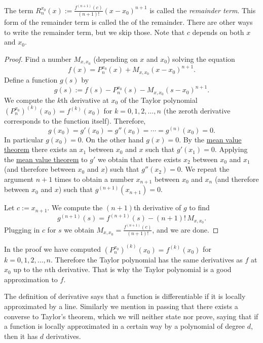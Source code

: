 \documentclass[12pt]{book}
\begin{document}
The term $R_n^{x_0}(x):=\frac{f^{(n+1)}(c)}{(n+1)!}{(x-x_0)}^{n+1}$ is called the
\emph{remainder term}.
This
form 
of the remainder term is called the
\emph{} of the remainder.
There are other ways
to write the remainder term, but we skip those.
Note that $c$ depends on
both $x$ and $x_0$.

\begin{proof}
Find a number $M_{x,x_0}$ (depending on $x$ and $x_0$) solving the equation
\begin{equation*}
f(x)=P_{n}^{x_0}(x)+M_{x,x_0}{(x-x_0)}^{n+1} .
\end{equation*}
Define a function $g(s)$ by
\begin{equation*}
g(s) := f(s)-P_n^{x_0}(s)-M_{x,x_0}{(s-x_0)}^{n+1} .
\end{equation*}
We compute
the $k$th derivative at $x_0$ of the Taylor polynomial
${(P_n^{x_0})}^{(k)}(x_0) = f^{(k)}(x_0)$ for
$k=0,1,2,\ldots,n$ (the zeroth derivative corresponds to the function
itself).
Therefore,
\begin{equation*}
g(x_0) = g'(x_0) = g''(x_0) = \cdots = g^{(n)}(x_0) = 0 .
\end{equation*}
In particular $g(x_0) = 0$.
On the other hand $g(x) = 0$.
By the
\hyperref[thm:mvt]{mean value theorem}
there exists an $x_1$ between $x_0$ and $x$ such that $g'(x_1) = 0$.
Applying the \hyperref[thm:mvt]{mean value theorem}
to $g'$ we obtain that there exists
$x_2$ between $x_0$ and $x_1$ (and therefore between $x_0$ and $x$)
such that $g''(x_2) = 0$.
We repeat the
argument $n+1$ times to obtain a number $x_{n+1}$ between $x_0$ and $x_n$
(and therefore between $x_0$ and $x$) such that $g^{(n+1)}(x_{n+1}) = 0$.

Let $c:=x_{n+1}$.
We compute the $(n+1)$th derivative of $g$ to find
\begin{equation*}
g^{(n+1)}(s) = f^{(n+1)}(s)-(n+1)!\,M_{x,x_0} .
\end{equation*}
Plugging in $c$ for $s$ we obtain $M_{x,x_0} = \frac{f^{(n+1)}(c)}{(n+1)!}$, and
we are done.
\end{proof}

In the proof we have computed 
${(P_n^{x_0})}^{(k)}(x_0) = f^{(k)}(x_0)$ for $k=0,1,2,\ldots,n$.
Therefore the Taylor polynomial has the same derivatives as $f$ at $x_0$
up to the $n$th derivative.
That is why the Taylor polynomial is
a good approximation to $f$.

The definition of derivative says that
a function is
differentiable if it
is locally approximated by a line.
Similarly we mention in passing that there exists a converse to Taylor's
theorem,
which we will neither state nor prove,
saying that if a function is
locally approximated in a certain way by a polynomial of degree $d$, then it
has $d$ derivatives.
\end{document}
